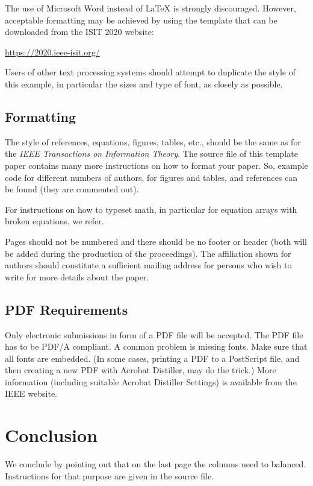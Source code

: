 \documentclass[conference,letterpaper]{IEEEtran}
\begin{document}
The use of Microsoft Word instead of \LaTeX{} is strongly
discouraged. However, acceptable formatting may be achieved by using
the template that can be downloaded from the ISIT 2020 website:
\begin{center}
  \url{https://2020.ieee-isit.org/}
\end{center}

Users of other text processing systems should attempt to duplicate the
style of this example, in particular the sizes and type of font, as
closely as possible.


\subsection{Formatting}

The style of references, equations, figures, tables, etc., should be
the same as for the \emph{IEEE Transactions on Information
  Theory}. The source file of this template paper contains many more
instructions on how to format your paper. So, example code for
different numbers of authors, for figures and tables, and references
can be found (they are commented out).

For instructions on how to typeset math, in particular for equation
arrays with broken equations, we refer.

Pages should not be numbered and there should be no footer or header
(both will be added during the production of the proceedings). The
affiliation shown for authors should constitute a sufficient mailing
address for persons who wish to write for more details about the
paper.


\subsection{PDF Requirements}

Only electronic submissions in form of a PDF file will be
accepted. The PDF file has to be PDF/A compliant. A common problem is
missing fonts. Make sure that all fonts are embedded. (In some cases,
printing a PDF to a PostScript file, and then creating a new PDF with
Acrobat Distiller, may do the trick.) More information (including
suitable Acrobat Distiller Settings) is available from the IEEE
website.


\section{Conclusion}\label{sec:con}

We conclude by pointing out that on the last page the columns need to
balanced. Instructions for that purpose are given in the source file.
\end{document}
